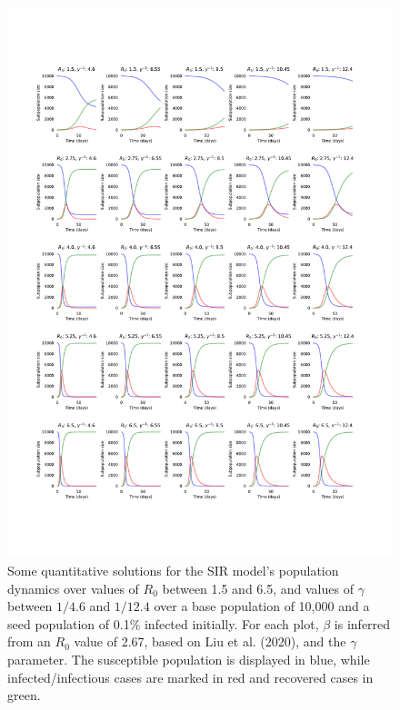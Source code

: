 \documentclass{article}
\begin{document}
\begin{figure}
	\includegraphics[width=\linewidth]{figures/fig1-odes}
	\caption{Some quantitative solutions for the SIR model's population dynamics over values of $R_0$ between 1.5 and 6.5, and values of $\gamma$ between $1/4.6$ and $1/12.4$ over a base population of 10,000 and a seed population of 0.1\% infected initially. For each plot, $\beta$ is inferred from an $R_0$ value of 2.67, based on Liu et al. (2020),\cite{liu2020reproductive} and the $\gamma$ parameter. The susceptible population is displayed in blue, while infected/infectious cases are marked in red and recovered cases in green.}
	\label{fig:ode_solutions}
\end{figure}
\end{document}
